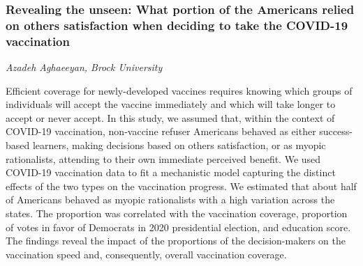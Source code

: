 \subsubsection*{Revealing the unseen: What portion of the Americans relied on others\textquotesingle{} satisfaction when deciding to take the COVID-19 vaccination}
\textit{Azadeh Aghaeeyan, Brock University}

Efficient coverage for newly-developed vaccines requires knowing which
groups of individuals will accept the vaccine immediately and which will
take longer to accept or never accept. In this study, we assumed that, within the context of COVID-19
vaccination, non-vaccine refuser Americans behaved as either
success-based learners, making decisions based on
others\textquotesingle{} satisfaction, or as myopic rationalists,
attending to their own immediate perceived benefit. We used COVID-19 vaccination data to fit a mechanistic model capturing
the distinct effects of the two types on the vaccination progress. We estimated that about half of Americans behaved as myopic rationalists
with a high variation across the states. The proportion was correlated with the vaccination coverage, proportion
of votes in favor of Democrats in 2020 presidential election, and
education score. The findings reveal the impact of the proportions of the decision-makers
on the vaccination speed and, consequently, overall vaccination
coverage.
